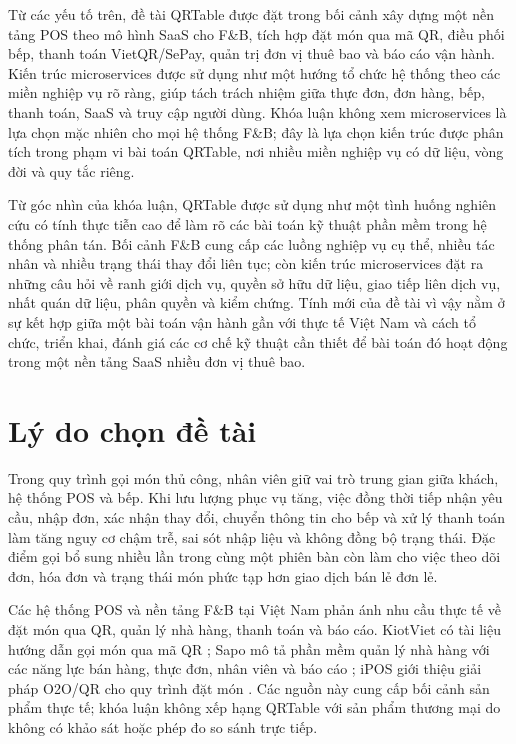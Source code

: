 Từ các yếu tố trên, đề tài QRTable được đặt trong bối cảnh xây dựng một nền tảng POS theo mô hình SaaS cho F\&B, tích hợp đặt món qua mã QR, điều phối bếp, thanh toán VietQR/SePay, quản trị đơn vị thuê bao và báo cáo vận hành. Kiến trúc microservices được sử dụng như một hướng tổ chức hệ thống theo các miền nghiệp vụ rõ ràng, giúp tách trách nhiệm giữa thực đơn, đơn hàng, bếp, thanh toán, SaaS và truy cập người dùng. Khóa luận không xem microservices là lựa chọn mặc nhiên cho mọi hệ thống F\&B; đây là lựa chọn kiến trúc được phân tích trong phạm vi bài toán QRTable, nơi nhiều miền nghiệp vụ có dữ liệu, vòng đời và quy tắc riêng.

Từ góc nhìn của khóa luận, QRTable được sử dụng như một tình huống nghiên cứu có tính thực tiễn cao để làm rõ các bài toán kỹ thuật phần mềm trong hệ thống phân tán. Bối cảnh F\&B cung cấp các luồng nghiệp vụ cụ thể, nhiều tác nhân và nhiều trạng thái thay đổi liên tục; còn kiến trúc microservices đặt ra những câu hỏi về ranh giới dịch vụ, quyền sở hữu dữ liệu, giao tiếp liên dịch vụ, nhất quán dữ liệu, phân quyền và kiểm chứng. Tính mới của đề tài vì vậy nằm ở sự kết hợp giữa một bài toán vận hành gần với thực tế Việt Nam và cách tổ chức, triển khai, đánh giá các cơ chế kỹ thuật cần thiết để bài toán đó hoạt động trong một nền tảng SaaS nhiều đơn vị thuê bao.

\section{Lý do chọn đề tài}

Trong quy trình gọi món thủ công, nhân viên giữ vai trò trung gian giữa khách, hệ thống POS và bếp. Khi lưu lượng phục vụ tăng, việc đồng thời tiếp nhận yêu cầu, nhập đơn, xác nhận thay đổi, chuyển thông tin cho bếp và xử lý thanh toán làm tăng nguy cơ chậm trễ, sai sót nhập liệu và không đồng bộ trạng thái. Đặc điểm gọi bổ sung nhiều lần trong cùng một phiên bàn còn làm cho việc theo dõi đơn, hóa đơn và trạng thái món phức tạp hơn giao dịch bán lẻ đơn lẻ.

Các hệ thống POS và nền tảng F\&B tại Việt Nam phản ánh nhu cầu thực tế về đặt món qua QR, quản lý nhà hàng, thanh toán và báo cáo. KiotViet có tài liệu hướng dẫn gọi món qua mã QR \cite{kiotviet-qr-order-doc}; Sapo mô tả phần mềm quản lý nhà hàng với các năng lực bán hàng, thực đơn, nhân viên và báo cáo \cite{sapo-fnb-restaurant-pos}; iPOS giới thiệu giải pháp O2O/QR cho quy trình đặt món \cite{ipos-o2o-qr-order}. Các nguồn này cung cấp bối cảnh sản phẩm thực tế; khóa luận không xếp hạng QRTable với sản phẩm thương mại do không có khảo sát hoặc phép đo so sánh trực tiếp.

